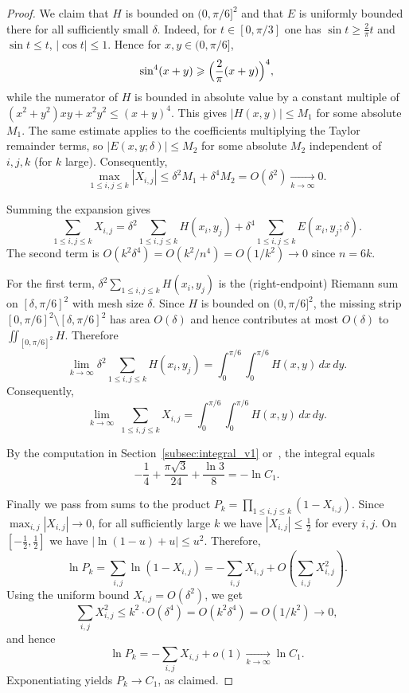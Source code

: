 \documentclass{article}
\theoremstyle{definition}
\let\le\leqslant
\let\ge\geqslant
\newcounter{row}
\begin{document}
\begin{proof}
We claim that $H$ is bounded on $(0,\pi/6]^2$ and that $E$ is uniformly bounded there for all
sufficiently small $\delta$. Indeed, for $t\in[0,\pi/3]$ one has
$\sin t\ge \frac{2}{\pi}t$ and $\sin t\le t$, $|\cos t|\le 1$. Hence for $x,y\in(0,\pi/6]$,
\[
\sin^4(x+y)\ge \Bigl(\frac{2}{\pi}(x+y)\Bigr)^4,
\]
while the numerator of $H$ is bounded in absolute value by a constant multiple of
$(x^2+y^2)xy+x^2y^2\le (x+y)^4$. This gives $|H(x,y)|\le M_1$ for some absolute $M_1$.
The same estimate applies to the coefficients multiplying the Taylor remainder terms, so
$|E(x,y;\delta)|\le M_2$ for some absolute $M_2$ independent of $i,j,k$ (for $k$ large).
Consequently,
\[
\max_{1\le i,j\le k}|X_{i,j}|
\le \delta^2 M_1+\delta^4 M_2
=O(\delta^2)\xrightarrow[k\to\infty]{}0.
\]

Summing the expansion gives
\[
\sum_{1\le i,j\le k}X_{i,j}
=
\delta^2\sum_{1\le i,j\le k}H(x_i,y_j)
+\delta^4\sum_{1\le i,j\le k}E(x_i,y_j;\delta).
\]
The second term is $O(k^2\delta^4)=O(k^2/n^4)=O(1/k^2)\to 0$ since $n=6k$.



For the first term, $\delta^2\sum_{1\le i,j\le k}H(x_i,y_j)$ is the (right-endpoint) Riemann sum on
$[\delta,\pi/6]^2$ with mesh size $\delta$.
Since $H$ is bounded on $(0,\pi/6]^2$, the missing strip
$[0,\pi/6]^2\setminus[\delta,\pi/6]^2$ has area $O(\delta)$ and hence contributes at most $O(\delta)$ to
$\iint_{[0,\pi/6]^2}H$.
Therefore
\[
\lim_{k\to\infty}\delta^2\sum_{1\le i,j\le k}H(x_i,y_j)
=\int_0^{\pi/6}\int_0^{\pi/6}H(x,y)\,dx\,dy.
\]
Consequently,
\[
\lim_{k\to\infty}\ \sum_{1\le i,j\le k}X_{i,j}
=
\int_0^{\pi/6}\int_0^{\pi/6}H(x,y)\,dx\,dy.
\]

By the computation in Section~\ref{subsec:integral_v1} or~\cite[\texttt{EP1045_1stregime}]{githubRepo}, the integral equals
\[
-\frac14+\frac{\pi\sqrt3}{24}+\frac{\ln 3}{8}=-\ln C_1.
\]

Finally we pass from sums to the product $P_k=\prod_{1\le i,j\le k}(1-X_{i,j})$.
Since $\max_{i,j}|X_{i,j}|\to 0$, for all sufficiently large $k$ we have $|X_{i,j}|\le \frac12$
for every $i,j$. On $[-\frac12,\frac12]$ we have \(|\ln(1-u)+u|\le u^2\). Therefore,
\[
\ln P_k=\sum_{i,j}\ln(1-X_{i,j})
=-\sum_{i,j}X_{i,j}+O\!\left(\sum_{i,j}X_{i,j}^2\right).
\]
Using the uniform bound $X_{i,j}=O(\delta^2)$, we get
\[
\sum_{i,j}X_{i,j}^2\le k^2\cdot O(\delta^4)=O(k^2\delta^4)=O(1/k^2)\to 0,
\]
and hence
\[
\ln P_k=-\sum_{i,j}X_{i,j}+o(1)\xrightarrow[k\to\infty]{}\ln C_1.
\]
Exponentiating yields $P_k\to C_1$, as claimed.
\end{proof}
\end{document}

